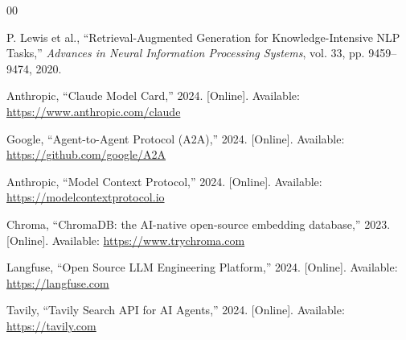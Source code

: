 \documentclass[conference]{IEEEtran}
\begin{document}
\begin{thebibliography}{00}

P. Lewis et al., ``Retrieval-Augmented Generation for Knowledge-Intensive NLP Tasks,'' \textit{Advances in Neural Information Processing Systems}, vol. 33, pp. 9459--9474, 2020.

Anthropic, ``Claude Model Card,'' 2024. [Online]. Available: \url{https://www.anthropic.com/claude}

Google, ``Agent-to-Agent Protocol (A2A),'' 2024. [Online]. Available: \url{https://github.com/google/A2A}

Anthropic, ``Model Context Protocol,'' 2024. [Online]. Available: \url{https://modelcontextprotocol.io}

Chroma, ``ChromaDB: the AI-native open-source embedding database,'' 2023. [Online]. Available: \url{https://www.trychroma.com}

Langfuse, ``Open Source LLM Engineering Platform,'' 2024. [Online]. Available: \url{https://langfuse.com}

Tavily, ``Tavily Search API for AI Agents,'' 2024. [Online]. Available: \url{https://tavily.com}

\end{thebibliography}
\end{document}
